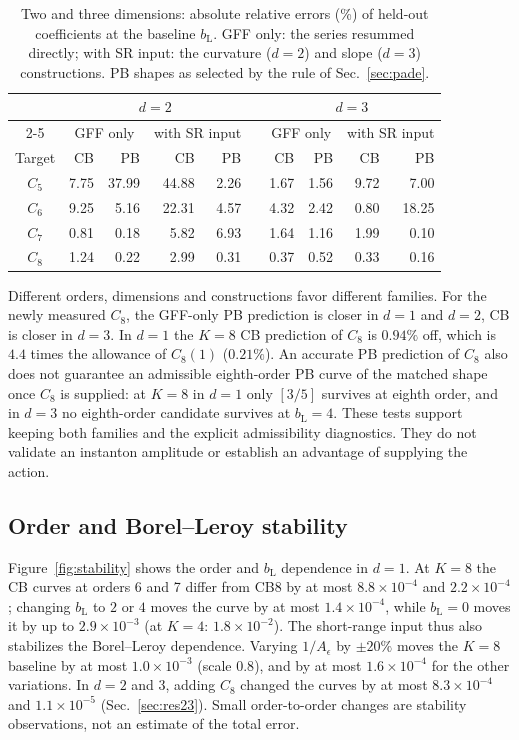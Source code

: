 \documentclass[11pt,a4paper]{article}
\numberwithin{equation}{section}
\newcommand{\Ae}{A_\epsilon}
\newcommand{\bL}{b_{\mathrm L}}
\newcommand{\sci}[2]{#1\times10^{#2}}
\begin{document}
\begin{table}[htbp]\centering\small
\begin{tabular}{@{}c rrrr c rrrr@{}}
\toprule
& \multicolumn{4}{c}{$d=2$} && \multicolumn{4}{c}{$d=3$}\\
\cmidrule{2-5}\cmidrule{7-10}
& \multicolumn{2}{c}{GFF only} & \multicolumn{2}{c}{with SR input} && \multicolumn{2}{c}{GFF only} & \multicolumn{2}{c}{with SR input}\\
Target & CB & PB & CB & PB && CB & PB & CB & PB\\ \midrule
$C_5$ & 7.75 & 37.99 & 44.88 & 2.26 && 1.67 & 1.56 & 9.72 & 7.00\\
$C_6$ & 9.25 & 5.16 & 22.31 & 4.57 && 4.32 & 2.42 & 0.80 & 18.25\\
$C_7$ & 0.81 & 0.18 & 5.82 & 6.93 && 1.64 & 1.16 & 1.99 & 0.10\\
$C_8$ & 1.24 & 0.22 & 2.99 & 0.31 && 0.37 & 0.52 & 0.33 & 0.16\\
\bottomrule
\end{tabular}
\caption{Two and three dimensions: absolute relative errors (\%) of held-out coefficients
at the baseline $\bL$. GFF only: the series resummed directly; with SR input: the curvature
($d=2$) and slope ($d=3$) constructions. PB shapes as selected by the rule of
Sec.~\ref{sec:pade}.}
\label{tab:heldout23}
\end{table}

Different orders, dimensions and constructions favor different families. For the
newly measured $C_8$, the GFF-only PB prediction is closer in $d=1$ and $d=2$, CB is
closer in $d=3$. In $d=1$ the $K=8$ CB prediction of $C_8$ is $0.94\%$ off, which is $4.4$
times the allowance of $C_8(1)$ ($0.21\%$). An accurate PB prediction of $C_8$ also does not
guarantee an admissible eighth-order PB curve of the matched shape once $C_8$ is supplied: at
$K=8$ in $d=1$ only $[3/5]$ survives at eighth order, and in $d=3$ no eighth-order candidate
survives at $\bL=4$. These tests support keeping both families and the
explicit admissibility diagnostics. They do not validate an instanton amplitude or establish
an advantage of supplying the action.

\subsection{Order and Borel--Leroy stability}
Figure~\ref{fig:stability} shows the order and $\bL$ dependence in $d=1$. At $K=8$ the CB
curves at orders 6 and 7 differ from CB8 by at most $\sci{8.8}{-4}$ and $\sci{2.2}{-4}$; changing
$\bL$ to $2$ or $4$ moves the curve by at most $\sci{1.4}{-4}$, while $\bL=0$ moves it by up to
$\sci{2.9}{-3}$ (at $K=4$: $\sci{1.8}{-2}$). The short-range input thus also stabilizes the
Borel--Leroy dependence. Varying $1/\Ae$ by $\pm20\%$ moves the $K=8$ baseline by at most
$\sci{1.0}{-3}$ (scale $0.8$), and by at most $\sci{1.6}{-4}$ for the other variations. In
$d=2$ and $3$, adding $C_8$ changed the curves by at most $\sci{8.3}{-4}$ and $\sci{1.1}{-5}$
(Sec.~\ref{sec:res23}). Small order-to-order changes are stability observations, not an
estimate of the total error.
\end{document}
